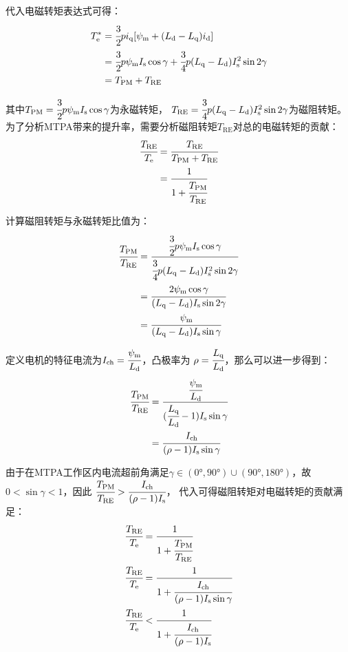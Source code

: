 代入电磁转矩表达式可得：
\begin{align*}
    T_{\mathrm{e}}^* &= \cfrac{3}{2}pi_{\mathrm{q}}[\psi_{\mathrm{m}}+(L_{\mathrm{d}}-L_{\mathrm{q}})i_{\mathrm{d}}]\\
    &=\cfrac{3}{2}p\psi_{\mathrm{m}}I_{\mathrm{s}}\cos\gamma+\cfrac{3}{4}p(L_{\mathrm{q}}-L_{\mathrm{d}})I_{\mathrm{s}}^2\sin2\gamma\\
    &=T_{\mathrm{PM}}+T_{\mathrm{RE}}
\end{align*}

其中\(T_{\mathrm{PM}}=\cfrac{3}{2}p\psi_{\mathrm{m}}I_{\mathrm{s}}\cos\gamma\)为永磁转矩，
\(T_{\mathrm{RE}}=\cfrac{3}{4}p(L_{\mathrm{q}}-L_{\mathrm{d}})I_{\mathrm{s}}^2\sin2\gamma\)为磁阻转矩。
为了分析MTPA带来的提升率，需要分析磁阻转矩\(T_{\mathrm{RE}}\)对总的电磁转矩的贡献：
\begin{align*}
    \cfrac{T_{\mathrm{RE}}}{T_{\mathrm{e}}}&=\cfrac{T_{\mathrm{RE}}}{T_{\mathrm{PM}}+T_{\mathrm{RE}}}\\
    &=\cfrac{1}{1+\cfrac{T_{\mathrm{PM}}}{T_{\mathrm{RE}}}}
\end{align*}

计算磁阻转矩与永磁转矩比值为：
\begin{align*}
    \cfrac{T_{\mathrm{PM}}}{T_{\mathrm{RE}}}&=\cfrac{\cfrac{3}{2}p\psi_{\mathrm{m}}I_{\mathrm{s}}\cos\gamma}
    {\cfrac{3}{4}p(L_{\mathrm{q}}-L_{\mathrm{d}})I_{\mathrm{s}}^2\sin2\gamma}\\
    &=\cfrac{2\psi_{\mathrm{m}}\cos\gamma}{(L_{\mathrm{q}}-L_{\mathrm{d}})I_{\mathrm{s}}\sin2\gamma}\\
    &=\cfrac{\psi_{\mathrm{m}}}{(L_{\mathrm{q}}-L_{\mathrm{d}})I_{\mathrm{s}}\sin\gamma}
\end{align*}

定义电机的特征电流为\(I_{\mathrm{ch}}=\cfrac{\psi_{\mathrm{m}}}{L_{\mathrm{d}}}\)，凸极率为
\(\rho=\cfrac{L_{\mathrm{q}}}{L_\mathrm{d}}\)，那么可以进一步得到：
\begin{align*}
    \cfrac{T_{\mathrm{PM}}}{T_{\mathrm{RE}}}&=\cfrac{\cfrac{\psi_{\mathrm{m}}}{L_{\mathrm{d}}}}
    {(\cfrac{L_{\mathrm{q}}}{L_{\mathrm{d}}}-1)I_{\mathrm{s}}\sin\gamma}\\
    &=\cfrac{I_{\mathrm{ch}}}{(\rho-1)I_{\mathrm{s}}\sin\gamma}
\end{align*}

由于在MTPA工作区内电流超前角满足\(\gamma\in(0°,90°)\cup(90°,180°)\)，故\(0<\sin\gamma<1\)，因此
\(\cfrac{T_{\mathrm{PM}}}{T_{\mathrm{RE}}}>\cfrac{I_{\mathrm{ch}}}{(\rho-1)I_{\mathrm{s}}}\)，
代入可得磁阻转矩对电磁转矩的贡献满足：
\begin{align}
    \cfrac{T_{\mathrm{RE}}}{T_{\mathrm{e}}}&=\cfrac{1}{1+\cfrac{T_{\mathrm{PM}}}{T_{\mathrm{RE}}}}\notag\\
    \cfrac{T_{\mathrm{RE}}}{T_{\mathrm{e}}}&=\cfrac{1}{1+\cfrac{I_{\mathrm{ch}}}{(\rho-1)I_{\mathrm{s}}\sin\gamma}}\notag\\
    \cfrac{T_{\mathrm{RE}}}{T_{\mathrm{e}}}&<\cfrac{1}{1+\cfrac{I_{\mathrm{ch}}}{(\rho-1)I_{\mathrm{s}}}}
    \label{eq:磁阻转矩贡献上限表达式}
\end{align}

